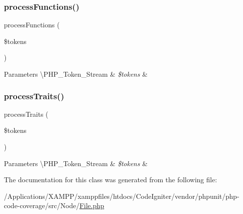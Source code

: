 \subsubsection{\texorpdfstring{process\+Functions()}{processFunctions()}}
{\footnotesize\ttfamily process\+Functions (\begin{DoxyParamCaption}\item[{\textbackslash{}\mbox{\hyperlink{class_p_h_p___token___stream}{P\+H\+P\+\_\+\+Token\+\_\+\+Stream}}}]{\$tokens }\end{DoxyParamCaption})\hspace{0.3cm}{\ttfamily [protected]}}


\begin{DoxyParams}[1]{Parameters}
\textbackslash{}\+P\+H\+P\+\_\+\+Token\+\_\+\+Stream & {\em \$tokens} & \\
\hline
\end{DoxyParams}
\mbox{\label{class_sebastian_bergmann_1_1_code_coverage_1_1_node_1_1_file_a2ae5ffccc758533bc01b13ad8ccc039f}} 
\subsubsection{\texorpdfstring{process\+Traits()}{processTraits()}}
{\footnotesize\ttfamily process\+Traits (\begin{DoxyParamCaption}\item[{\textbackslash{}\mbox{\hyperlink{class_p_h_p___token___stream}{P\+H\+P\+\_\+\+Token\+\_\+\+Stream}}}]{\$tokens }\end{DoxyParamCaption})\hspace{0.3cm}{\ttfamily [protected]}}


\begin{DoxyParams}[1]{Parameters}
\textbackslash{}\+P\+H\+P\+\_\+\+Token\+\_\+\+Stream & {\em \$tokens} & \\
\hline
\end{DoxyParams}


The documentation for this class was generated from the following file\+:\begin{DoxyCompactItemize}
\item 
/\+Applications/\+X\+A\+M\+P\+P/xamppfiles/htdocs/\+Code\+Igniter/vendor/phpunit/php-\/code-\/coverage/src/\+Node/\mbox{\hyperlink{phpunit_2php-code-coverage_2src_2_node_2_file_8php}{File.\+php}}\end{DoxyCompactItemize}
